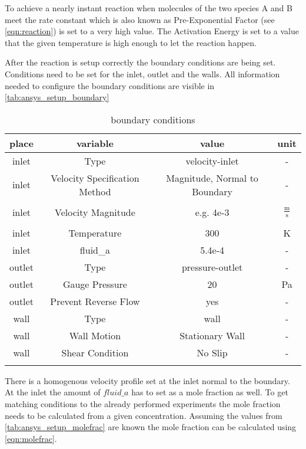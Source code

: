 \documentclass[../thesis.tex]{subfiles}
\begin{document}
To achieve a nearly instant reaction when molecules of the two species A and B meet the rate constant which is also known as Pre-Exponential Factor (see \autoref{eqn:reaction}) is set to a very high value. The Activation Energy is set to a value that the given temperature is high enough to let the reaction happen.

After the reaction is setup correctly the boundary conditions are being set. Conditions need to be set for the inlet, outlet and the walls. All information needed to configure the boundary conditions are visible in \autoref{tab:ansys_setup_boundary}

\begin{table} [htb]
	\centering
	\caption{boundary conditions}
	\begin{tabular}{ cccc }
		\hline
		place & variable & value & unit \\
		\hline
		inlet & Type & velocity-inlet & - \\
		inlet & Velocity Specification Method & Magnitude, Normal to Boundary & - \\
		\\[-1em]
		inlet & Velocity Magnitude & e.g. 4e-3 & $\frac{\text{m}}{\text{s}}$ \\
		\\[-1em]
		inlet & Temperature & 300 & K \\
		inlet & fluid\_a & 5.4e-4 & - \\
		outlet & Type & pressure-outlet & - \\
		outlet & Gauge Pressure & 20 & Pa \\
		outlet & Prevent Reverse Flow & yes & - \\
		wall & Type & wall & - \\
		wall & Wall Motion & Stationary Wall & - \\
		wall & Shear Condition & No Slip & - \\
		\hline
		\label{tab:ansys_setup_boundary}
	\end{tabular}
\end{table}
There is a homogenous velocity profile set at the inlet normal to the boundary. At the inlet the amount of $fluid\_a$ has to set as a mole fraction as well. To get matching conditions to the already performed experiments the mole fraction needs to be calculated from a given concentration. Assuming the values from \autoref{tab:ansys_setup_molefrac} are known the mole fraction can be calculated using \autoref{eqn:molefrac}.
\end{document}
